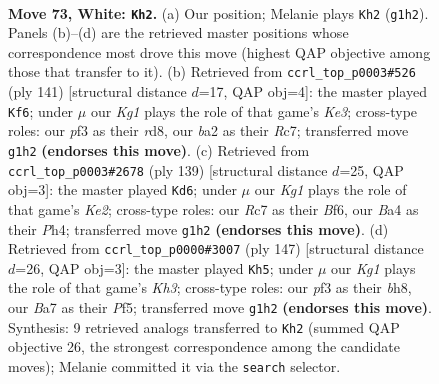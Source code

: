 \documentclass[11pt]{article}
\begin{document}
\clearpage

\begin{figure}[p]\centering
\begin{subfigure}{0.46\textwidth}\centering
\resizebox{\linewidth}{!}{%
\newchessgame
\chessboard[
  setfen={6k1/B1R5/4r3/8/B3p2p/5p1P/b4P2/6K1 w - - 56 73},
  showmover=false,
  pgfstyle=straightmove, color=movearrow, markmove={g1-h2}
]}
\caption{}
\end{subfigure}\hfill
\begin{subfigure}{0.46\textwidth}\centering
\resizebox{\linewidth}{!}{%
\newchessgame
\chessboard[
  setfen={3R4/2r4p/Bp2k3/2b2p1P/P1P2P2/8/6K1/8 b - - 62 71},
  showmover=false,
  pgfstyle=straightmove, color=movearrow, markmove={e6-f6}
]}
\caption{}
\end{subfigure}
\\[4pt]
\begin{subfigure}{0.46\textwidth}\centering
\resizebox{\linewidth}{!}{%
\newchessgame
\chessboard[
  setfen={8/p3k3/1p3b2/1P3P1B/P3K2p/7P/8/8 b - - 15 70},
  showmover=false,
  pgfstyle=straightmove, color=movearrow, markmove={e7-d6}
]}
\caption{}
\end{subfigure}\hfill
\begin{subfigure}{0.46\textwidth}\centering
\resizebox{\linewidth}{!}{%
\newchessgame
\chessboard[
  setfen={7B/7p/2p4k/5p2/p4P2/P7/1Pb2K1P/8 b - - 32 74},
  showmover=false,
  pgfstyle=straightmove, color=movearrow, markmove={h6-h5}
]}
\caption{}
\end{subfigure}
\caption{\textbf{Move 73, White: \texttt{Kh2}.} (a) Our position; Melanie plays \texttt{Kh2} (\texttt{g1h2}). Panels (b)--(d) are the retrieved master positions whose correspondence most drove this move (highest QAP objective among those that transfer to it). (b) Retrieved from \texttt{ccrl\_top\_p0003\#526} (ply 141) [structural distance $d$=17, QAP obj=4]: the master played \texttt{Kf6}; under $\mu$ our \emph{Kg1} plays the role of that game's \emph{Ke3}; cross-type roles: our \emph{p}f3 as their \emph{r}d8, our \emph{b}a2 as their \emph{R}c7; transferred move \texttt{g1h2} \textbf{(endorses this move)}. (c) Retrieved from \texttt{ccrl\_top\_p0003\#2678} (ply 139) [structural distance $d$=25, QAP obj=3]: the master played \texttt{Kd6}; under $\mu$ our \emph{Kg1} plays the role of that game's \emph{Ke2}; cross-type roles: our \emph{R}c7 as their \emph{B}f6, our \emph{B}a4 as their \emph{P}h4; transferred move \texttt{g1h2} \textbf{(endorses this move)}. (d) Retrieved from \texttt{ccrl\_top\_p0000\#3007} (ply 147) [structural distance $d$=26, QAP obj=3]: the master played \texttt{Kh5}; under $\mu$ our \emph{Kg1} plays the role of that game's \emph{Kh3}; cross-type roles: our \emph{p}f3 as their \emph{b}h8, our \emph{B}a7 as their \emph{P}f5; transferred move \texttt{g1h2} \textbf{(endorses this move)}. Synthesis: 9 retrieved analogs transferred to \texttt{Kh2} (summed QAP objective 26, the strongest correspondence among the candidate moves); Melanie committed it via the \texttt{search} selector.}
\label{fig:thought-m144}
\end{figure}
\end{document}
